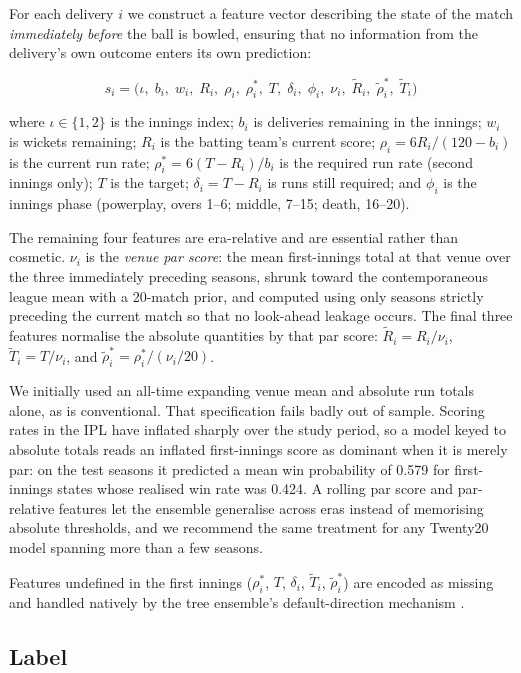 \documentclass[conference]{IEEEtran}
\begin{document}
For each delivery $i$ we construct a feature vector describing the state
of the match \emph{immediately before} the ball is bowled, ensuring that
no information from the delivery's own outcome enters its own
prediction:

\[
s_i = \big(\iota,\; b_i,\; w_i,\; R_i,\; \rho_i,\; \rho^{*}_i,\; T,\;
\delta_i,\; \phi_i,\; \nu_i,\; \tilde{R}_i,\; \tilde{\rho}^{*}_i,\;
\tilde{T}_i\big)
\]

where $\iota \in \{1,2\}$ is the innings index; $b_i$ is deliveries
remaining in the innings; $w_i$ is wickets remaining; $R_i$ is the
batting team's current score; $\rho_i = 6R_i / (120 - b_i)$ is the
current run rate; $\rho^{*}_i = 6(T - R_i)/b_i$ is the required run rate
(second innings only); $T$ is the target; $\delta_i = T - R_i$ is runs
still required; and $\phi_i$ is the innings phase (powerplay, overs
1--6; middle, 7--15; death, 16--20).

The remaining four features are era-relative and are essential rather
than cosmetic. $\nu_i$ is the \emph{venue par score}: the mean
first-innings total at that venue over the three immediately preceding
seasons, shrunk toward the contemporaneous league mean with a 20-match
prior, and computed using only seasons strictly preceding the current
match so that no look-ahead leakage occurs. The final three features
normalise the absolute quantities by that par score:
$\tilde{R}_i = R_i/\nu_i$, $\tilde{T}_i = T/\nu_i$, and
$\tilde{\rho}^{*}_i = \rho^{*}_i /(\nu_i/20)$.

We initially used an all-time expanding venue mean and absolute run
totals alone, as is conventional. That specification fails badly out of
sample. Scoring rates in the IPL have inflated sharply over the study
period, so a model keyed to absolute totals reads an inflated
first-innings score as dominant when it is merely par: on the test
seasons it predicted a mean win probability of 0.579 for first-innings
states whose realised win rate was 0.424. A rolling par score and
par-relative features let the ensemble generalise across eras instead of
memorising absolute thresholds, and we recommend the same treatment for
any Twenty20 model spanning more than a few seasons.

Features undefined in the first innings ($\rho^{*}_i$, $T$, $\delta_i$,
$\tilde{T}_i$, $\tilde{\rho}^{*}_i$) are encoded as missing and handled
natively by the tree ensemble's default-direction mechanism
\cite{chen2016}.

\subsection{Label}
\end{document}
